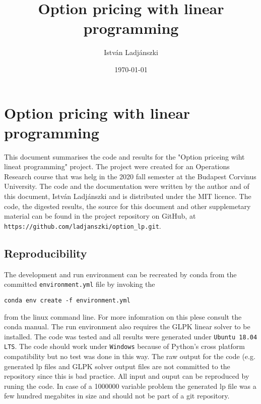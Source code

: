 \documentclass[11pt]{article}
\author{István Ladjánszki}
\date{\today}
\title{Option pricing with linear programming}
\begin{document}
\maketitle

\section{Option pricing with linear programming}
This document summarises the code and results for the "Option priceing wiht lineat programming" project. The project were created for an Operations Research course that was helg in the 2020 fall semester at the Budapest Corvinus University. The code and the documentation were written by the author and of this document, István Ladjánszki and is distributed under the MIT licence. The code, the digested results, the source for this document and other supplemetary material can be found in the project repository on GitHub, at \texttt{https://github.com/ladjanszki/option\_lp.git}.

\subsection{Reproducibility}
The development and run environment can be recreated by conda from the committed \texttt{environment.yml} file by invoking the 
\begin{verbatim}
conda env create -f environment.yml
\end{verbatim}
from the linux command line.  For more infomration on this plese consult the conda manual. The run environment also requires the GLPK linear solver to be installed. The code was tested and all results were generated under \texttt{Ubuntu 18.04 LTS}. The code should work under \texttt{Windows} because of Python's cross platform compatibility but no test was done in this way. The raw output for the code (e.g. generated lp files and GLPK solver output files are not committed to the repository since this is bad practice. All input and ouput can be reproduced by runing the code. In case of a 1000000 variable problem the generated lp file was a few hundred megabites in size and should not be part of a git repository.
\end{document}
